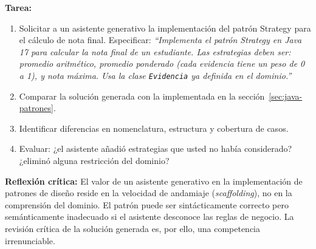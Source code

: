 \begin{tcolorbox}[actividadIA, title={Actividad IA — Sprint 7: Patrones de diseño con asistencia generativa}]
\textbf{Tarea:}
\begin{enumerate}
  \item Solicitar a un asistente generativo la implementación del patrón Strategy
  para el cálculo de nota final. Especificar: \textit{``Implementa el patrón Strategy
  en Java 17 para calcular la nota final de un estudiante. Las estrategias deben ser:
  promedio aritmético, promedio ponderado (cada evidencia tiene un peso de 0 a 1),
  y nota máxima. Usa la clase \texttt{Evidencia} ya definida en el dominio.''}
  \item Comparar la solución generada con la implementada en la sección~\ref{sec:java-patrones}.
  \item Identificar diferencias en nomenclatura, estructura y cobertura de casos.
  \item Evaluar: ¿el asistente añadió estrategias que usted no había considerado?
  ¿eliminó alguna restricción del dominio?
\end{enumerate}

\vspace{6pt}
\textbf{Reflexión crítica:} El valor de un asistente generativo en la implementación de
patrones de diseño reside en la velocidad de andamiaje (\textit{scaffolding}), no en
la comprensión del dominio. El patrón puede ser sintácticamente correcto pero
semánticamente inadecuado si el asistente desconoce las reglas de negocio.
La revisión crítica de la solución generada es, por ello, una competencia irrenunciable.
\end{tcolorbox}
